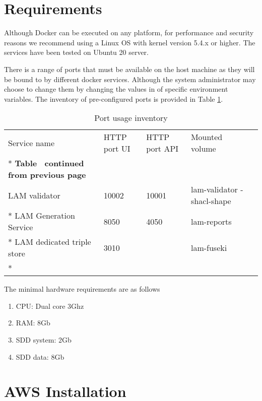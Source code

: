 \section{Requirements}
\label{sec:requirements}

Although Docker can be executed on any platform, for performance and security reasons we recommend using a Linux OS with kernel version 5.4.x or higher. The services have been tested on Ubuntu 20 server.

There is a range of ports that must be available on the host machine as they will be bound to by different docker services. Although the system administrator may choose to change them by changing the values in of specific environment variables. The inventory of pre-configured ports is provided in Table \ref{tab:port-inventory}.

\begin{longtable}[c]{@{}p{3.64cm}p{1.25cm}p{1.25cm}p{1.9cm}p{5cm}@{}}
	\toprule
	Service name  & HTTP port UI & HTTP port API & Mounted volume \\* \midrule
	\endfirsthead
	\multicolumn{5}{c}%
	{{\bfseries Table \thetable\ continued from previous page}}              \\
	\endhead
	\bottomrule
	\endfoot
	\endlastfoot
	LAM validator & 10002       & 10001          &     lam-validator -shacl-shape          \\* \hline
	LAM Generation Service & 8050         & 4050               &         lam-reports       \\* \hline
	LAM dedicated triple store & 3010                 &          &    lam-fuseki            \\* \hline
	\caption{Port usage inventory}
	\label{tab:port-inventory}                                               \\
\end{longtable}

The minimal hardware requirements are as follows
\begin{enumerate}
	\item CPU: Dual core 3Ghz
	\item RAM: 8Gb
	\item SDD system: 2Gb
	\item SDD data: 8Gb
\end{enumerate}

\section{AWS Installation}
\label{sec:aws-installation}

